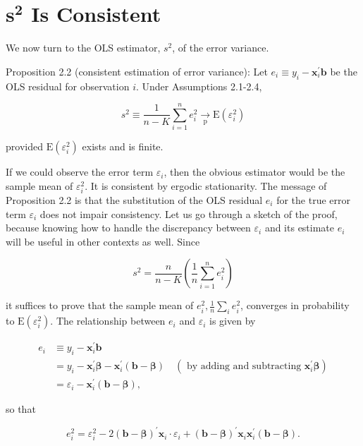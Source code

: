 \documentclass[10pt]{article}
\begin{document}
\section*{$\boldsymbol{s}^{\mathbf{2}}$ Is Consistent}
We now turn to the OLS estimator, $s^{2}$, of the error variance.

Proposition 2.2 (consistent estimation of error variance): Let $e_{i} \equiv y_{i}-\mathbf{x}_{i}^{\prime} \mathbf{b}$ be the OLS residual for observation $i$. Under Assumptions 2.1-2.4,

$$
s^{2} \equiv \frac{1}{n-K} \sum_{i=1}^{n} e_{i}^{2} \underset{\mathrm{p}}{\rightarrow} \mathrm{E}\left(\varepsilon_{i}^{2}\right)
$$

provided $\mathrm{E}\left(\varepsilon_{i}^{2}\right)$ exists and is finite.

If we could observe the error term $\varepsilon_{i}$, then the obvious estimator would be the sample mean of $\varepsilon_{i}^{2}$. It is consistent by ergodic stationarity. The message of Proposition 2.2 is that the substitution of the OLS residual $e_{i}$ for the true error term $\varepsilon_{i}$ does not impair consistency. Let us go through a sketch of the proof, because knowing how to handle the discrepancy between $\varepsilon_{i}$ and its estimate $e_{i}$ will be useful in other contexts as well. Since

$$
s^{2}=\frac{n}{n-K}\left(\frac{1}{n} \sum_{i=1}^{n} e_{i}^{2}\right)
$$

it suffices to prove that the sample mean of $e_{i}^{2}, \frac{1}{n} \sum_{i} e_{i}^{2}$, converges in probability to $\mathrm{E}\left(\varepsilon_{i}^{2}\right)$. The relationship between $e_{i}$ and $\varepsilon_{i}$ is given by


\begin{align*}
e_{i} & \equiv y_{i}-\mathbf{x}_{i}^{\prime} \mathbf{b} \\
& =y_{i}-\mathbf{x}_{i}^{\prime} \boldsymbol{\beta}-\mathbf{x}_{i}^{\prime}(\mathbf{b}-\boldsymbol{\beta}) \quad\left(\text { by adding and subtracting } \mathbf{x}_{i}^{\prime} \boldsymbol{\beta}\right) \\
& =\varepsilon_{i}-\mathbf{x}_{i}^{\prime}(\mathbf{b}-\boldsymbol{\beta}), \tag{2.3.9}
\end{align*}


so that


\begin{equation*}
e_{i}^{2}=\varepsilon_{i}^{2}-2(\mathbf{b}-\boldsymbol{\beta})^{\prime} \mathbf{x}_{i} \cdot \varepsilon_{i}+(\mathbf{b}-\boldsymbol{\beta})^{\prime} \mathbf{x}_{i} \mathbf{x}_{i}^{\prime}(\mathbf{b}-\boldsymbol{\beta}) . \tag{2.3.10}
\end{equation*}
\end{document}
